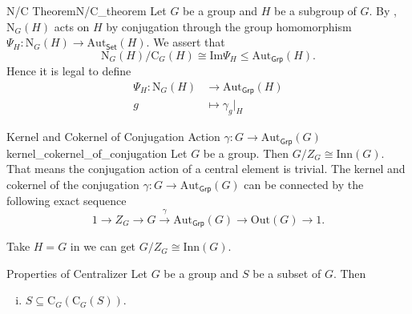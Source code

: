 \begin{theorem}{N/C Theorem}{N/C_theorem}
    Let $G$ be a group and $H$ be a subgroup of $G$. By , $\mathrm{N}_G(H)$ acts on $H$ by conjugation through the group homomorphism $\Psi_H:\mathrm{N}_G(H)\to \mathrm{Aut}_{\mathsf{Set}}(H)$. We assert that
    \[
        \mathrm{N}_G(H)/\mathrm{C}_G(H) \cong \mathrm{Im}\Psi_H\le \mathrm{Aut}_{\mathsf{Grp}}(H).
    \]
    Hence it is legal to define
    \begin{align*}
        \Psi_H: \mathrm{N}_G(H) & \longrightarrow \mathrm{Aut}_{\mathsf{Grp}}(H) \\
        g                       & \longmapsto \gamma_g|_H
    \end{align*}
\end{theorem}

\begin{corollary}{Kernel and Cokernel of Conjugation Action $\gamma:G\to \mathrm{Aut}_{\mathsf{Grp}}(G)$}{kernel_cokernel_of_conjugation}
    Let $G$ be a group. Then $G/Z_G\cong \mathrm{Inn}(G)$. That means the conjugation action of a central element is trivial. The kernel and cokernel of the conjugation $\gamma:G\to \mathrm{Aut}_{\mathsf{Grp}}(G)$ can be connected by the following exact sequence
    \[
        1\longrightarrow Z_G\longrightarrow G\xrightarrow{\hspace{5pt}\gamma\hspace{5pt}}\mathrm{Aut}_{\mathsf{Grp}}(G)\longrightarrow \mathrm{Out}(G)\longrightarrow 1.
    \]
\end{corollary}

\begin{prf}
    Take $H=G$ in  we can get $G/Z_G\cong \mathrm{Inn}(G)$.
\end{prf}





\begin{proposition}{Properties of Centralizer}{}
    Let $G$ be a group and $S$ be a subset of $G$. Then
    \begin{enumerate}[(i)]
        \item $S\subseteq\mathrm{C}_G(\mathrm{C}_G(S))$.
    \end{enumerate}
\end{proposition}

